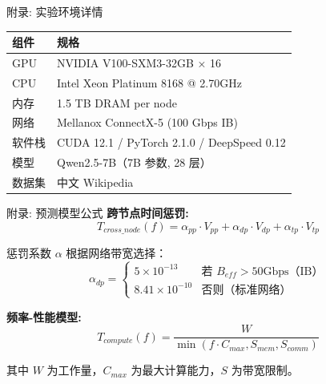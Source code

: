 \documentclass[aspectratio=169,10pt]{beamer}
\begin{document}
\begin{frame}{附录: 实验环境详情}
\begin{table}
\centering
\small
\begin{tabular}{ll}
\toprule
\textbf{组件} & \textbf{规格} \\
\midrule
GPU & NVIDIA V100-SXM3-32GB × 16 \\
CPU & Intel Xeon Platinum 8168 @ 2.70GHz \\
内存 & 1.5 TB DRAM per node \\
网络 & Mellanox ConnectX-5 (100 Gbps IB) \\
\midrule
软件栈 & CUDA 12.1 / PyTorch 2.1.0 / DeepSpeed 0.12 \\
模型 & Qwen2.5-7B（7B 参数, 28 层） \\
数据集 & 中文 Wikipedia \\
\bottomrule
\end{tabular}
\end{table}
\end{frame}

\begin{frame}{附录: 预测模型公式}
\textbf{跨节点时间惩罚:}
\[
T_{cross\_node}(f) = \alpha_{pp} \cdot V_{pp} + \alpha_{dp} \cdot V_{dp} + \alpha_{tp} \cdot V_{tp}
\]

惩罚系数 $\alpha$ 根据网络带宽选择：
\[
\alpha_{dp} = \begin{cases}
5 \times 10^{-13} & \text{若 } B_{eff} > 50\text{Gbps（IB）} \\
8.41 \times 10^{-10} & \text{否则（标准网络）}
\end{cases}
\]
\vspace{0.3cm}

\textbf{频率-性能模型:}
\[
T_{compute}(f) = \frac{W}{\min(f \cdot C_{max}, S_{mem}, S_{comm})}
\]

其中 $W$ 为工作量，$C_{max}$ 为最大计算能力，$S$ 为带宽限制。
\end{frame}
\end{document}
